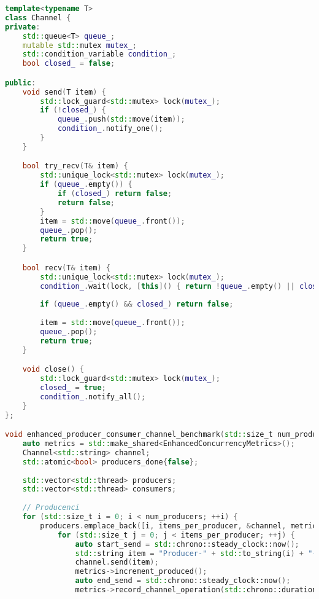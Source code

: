 \begin{lstlisting}[language=C++, caption={Producent-Konsument w C++ z Channel}, label={lst:cpp_producer_consumer}]
template<typename T>
class Channel {
private:
    std::queue<T> queue_;
    mutable std::mutex mutex_;
    std::condition_variable condition_;
    bool closed_ = false;

public:
    void send(T item) {
        std::lock_guard<std::mutex> lock(mutex_);
        if (!closed_) {
            queue_.push(std::move(item));
            condition_.notify_one();
        }
    }

    bool try_recv(T& item) {
        std::unique_lock<std::mutex> lock(mutex_);
        if (queue_.empty()) {
            if (closed_) return false;
            return false;
        }
        item = std::move(queue_.front());
        queue_.pop();
        return true;
    }

    bool recv(T& item) {
        std::unique_lock<std::mutex> lock(mutex_);
        condition_.wait(lock, [this]() { return !queue_.empty() || closed_; });
        
        if (queue_.empty() && closed_) return false;
        
        item = std::move(queue_.front());
        queue_.pop();
        return true;
    }

    void close() {
        std::lock_guard<std::mutex> lock(mutex_);
        closed_ = true;
        condition_.notify_all();
    }
};

void enhanced_producer_consumer_channel_benchmark(std::size_t num_producers, std::size_t num_consumers, std::size_t items_per_producer) {
    auto metrics = std::make_shared<EnhancedConcurrencyMetrics>();
    Channel<std::string> channel;
    std::atomic<bool> producers_done{false};
    
    std::vector<std::thread> producers;
    std::vector<std::thread> consumers;
    
    // Producenci
    for (std::size_t i = 0; i < num_producers; ++i) {
        producers.emplace_back([i, items_per_producer, &channel, metrics]() {
            for (std::size_t j = 0; j < items_per_producer; ++j) {
                auto start_send = std::chrono::steady_clock::now();
                std::string item = "Producer-" + std::to_string(i) + "-Item-" + std::to_string(j);
                channel.send(item);
                metrics->increment_produced();
                auto end_send = std::chrono::steady_clock::now();
                metrics->record_channel_operation(std::chrono::duration_cast<std::chrono::nanoseconds>(end_send - start_send));
                

\end{lstlisting}
